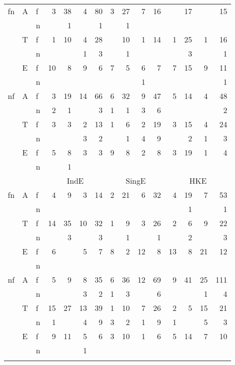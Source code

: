 \begin{table}
\begin{tabular}{lll *{12}{r}}
\cmidrule(lr){4-7}\cmidrule(lr){8-11}\cmidrule(lr){12-15}
fn & A & f & 3  & 38 & 4  & 80 & 3 & 27 & 7 & 16 &   & 17 &   & 15\\
    &              & n &    & 1  &    & 1  &   & 1  &   &    &   &    &   & \\
    & T & f & 1  & 10 & 4  & 28 &   & 10 & 1 & 14 & 1 & 25 & 1 & 16\\
    &              & n &    &    & 1  & 3  &   & 1  &   &    &   & 3  &   & 1\\
    & E & f & 10 & 8  & 9  & 6  & 7 & 5  & 6 & 7  & 7 & 15 & 9 & 11\\
    &              & n &    &    &    &    &   &    & 1 &    &   &    &   & 1\\
nf  & A & f & 3  & 19 & 14 & 66 & 6 & 32 & 9 & 47 & 5 & 14 & 4 & 48\\
    &              & n & 2  & 1  &    & 3  & 1 & 1  & 3 & 6  &   &    &   & 2\\
    & T & f & 3  & 3  & 2  & 13 & 1 & 6  & 2 & 19 & 3 & 15 & 4 & 24\\
    &              & n &    &    & 3  & 2  &   & 1  & 4 & 9  &   & 2  & 1 & 3\\
    & E & f & 5  & 8  & 3  & 3  & 9 & 8  & 2 & 8  & 3 & 19 & 1 & 4\\
    &              & n &    & 1  &    &    &   &    &   &    &   &    &   & \\
\cmidrule(lr){4-7}\cmidrule(lr){8-11}\cmidrule(lr){12-15}
&  & & \multicolumn{4}{c}{IndE}  & \multicolumn{4}{c}{SingE}  & \multicolumn{4}{c}{HKE}\\
\cmidrule(lr){4-7}\cmidrule(lr){8-11}\cmidrule(lr){12-15}
fn & A & f & 4  & 9  & 3  & 14 & 2 & 21 & 6  & 32 & 4  & 19 & 7 & 53\\
    &              & n &    &    &    &    &   &    &    &    &    & 1  &  & 1\\
    & T & f & 14 & 35 & 10 & 32 & 1 & 9  & 3  & 26 & 2  & 6  & 9 & 22\\
    &              & n &    & 3  &    & 3  &   & 1  &    & 1  &    & 2  &  & 3\\
    & E & f & 6  &    & 5  & 7  & 8 & 2  & 12 & 8  & 13 & 8  & 21 & 12\\
    &              & n &    &    &    &    &   &    &    &    &    &    &  & \\
nf  & A & f &  5 & 9  & 8  & 35 & 6 & 36 & 12 & 69 & 9  & 41 & 25 & 111\\
    &              & n &    &    & 3  & 2  & 1 & 3  &    & 6  &    &    & 1 & 4\\
    & T & f & 15 & 27 & 13 & 39 & 1 & 10 & 7  & 26 & 2  & 5  & 15 & 21\\
    &              & n & 1  &    & 4  & 9  & 3 & 2  & 1  & 9  & 1  &    & 5 & 3\\
    & E & f & 9  & 11 & 5  & 6  & 3 & 10 & 1  & 6  & 5  & 14 & 7 & 10\\
    &              & n &    &    & 1  &    &   &    &    &    &    &    &  & \\
\lspbottomrule
\end{tabular}
\end{table}

